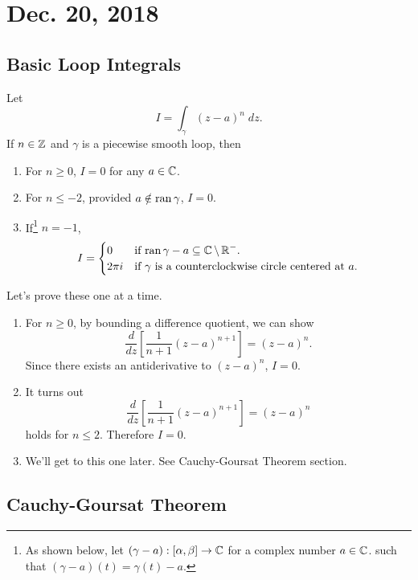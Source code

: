 \section{Dec. 20, 2018}
\subsection{Basic Loop Integrals}

\noindent
Let 
\[ I = \int_{\gamma} {(z-a)}^n \; dz. \]
If $n \in \operatorname{\mathbb{Z}}$ and $\gamma$  is a piecewise smooth loop, then
\begin{enumerate}
    \item For $n \ge 0$, $I = 0$ for any $a \in \operatorname{\mathbb{C}}$.
    \item For $n \le -2$, provided $a \notin \operatorname{ran}{\gamma}$,
        $I = 0$.
    \item If\footnote{As shown below, let $(\gamma - a): [\alpha, \beta] \to \operatorname{\mathbb{C}}$ for a complex number $a \in \operatorname{\mathbb{C}}$. 
                such that $(\gamma - a)(t) = \gamma(t) - a$.} $n = -1$,
        \[ I = \begin{cases}
                0 & \text{if $\operatorname{ran}{\gamma - a} \subseteq \operatorname{\mathbb{C}} \setminus \operatorname{\mathbb{R}}^-$.} \\
                2\pi i & \text{if $\gamma$ is a counterclockwise circle 
                centered at $a$.}
            \end{cases}
        \]
       
\end{enumerate}

Let's prove these one at a time.

\begin{enumerate}
    \item For $n \ge 0$, 
        by bounding a difference quotient, we can show
        \[ \frac{d}{dz} \left[ \frac{1}{n+1}(z-a)^{n+1}\right] =
        (z-a)^n. \]
        Since there exists an antiderivative to $(z-a)^n$,
        $I = 0$.
    \item It turns out
        \[ \frac{d}{dz} \left[ \frac{1}{n+1}{(z-a)}^{n+1}\right] =
        {(z-a)}^n \]
        holds for $n \le 2$.
        Therefore $I = 0$.
    \item We'll get to this one later.
        See Cauchy-Goursat Theorem section.
\end{enumerate}

\subsection{Cauchy-Goursat Theorem}

